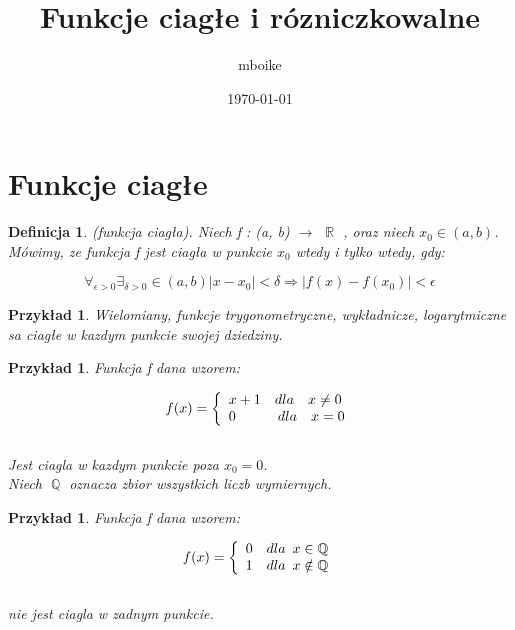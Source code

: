 \documentclass[11pt,a4paper]{article}
\title{Funkcje ciagłe i rózniczkowalne}
\author{mboike}
\date{\today}
\newtheorem{df}[tw]{Definicja}
\newtheorem{ex}[tw]{Przykład}
\DeclareMathOperator{\R}{\mathbb{R}}
\DeclareMathOperator{\Q}{\mathbb{Q}}
\begin{document}
\maketitle


\tableofcontents

\section{Funkcje ciagłe}

\begin{df} 
(funkcja ciagła). Niech f : (a, b) $\rightarrow$ $\R$ , oraz niech  $x_{0} \in (a, b)$. Mówimy, ze funkcja f jest ciagła w punkcie $x_{0}$ wtedy i tylko wtedy, gdy:
\end{df}

\[\forall _{\epsilon>0} \exists_{\delta>0} \in (a, b) | x-x_{0} | < \delta \Rightarrow |f(x) - f(x_{0})| < \epsilon \]



\begin{ex}  Wielomiany, funkcje trygonometryczne, wykładnicze, logarytmiczne
sa ciagłe w kazdym punkcie swojej dziedziny.
\end{ex}

\begin{ex} Funkcja f dana wzorem:

\[f(x) = \left\{ \begin{array}{l} x+1 \hspace{10bp} dla \hspace{10bp} x \not= 0 \\ 0 \hspace{30bp} dla \hspace{10bp} x = 0 \end{array} \right. \]  
\\
Jest ciagla w kazdym punkcie poza $ x_{0} = 0 $.\\
Niech $\Q$ oznacza zbior wszystkich liczb wymiernych.

\end{ex}

\begin{ex} Funkcja f dana wzorem:

\[f(x) = \left\{ \begin{array}{l} 0 \hspace{10bp} dla \hspace{5bp} x \in \Q \\ 1 \hspace{10bp} dla \hspace{5bp} x 
\notin \Q \end{array} \right. \]
\\
nie jest ciagla w zadnym punkcie.
\end{ex}
\end{document}
